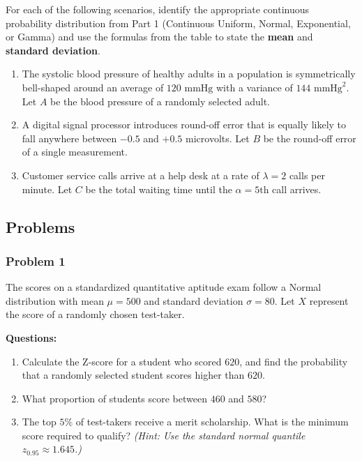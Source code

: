 \documentclass[
]{article}
\providecommand{\tightlist}{%
  \setlength{\itemsep}{0pt}\setlength{\parskip}{0pt}}
\begin{document}
For each of the following scenarios, identify the appropriate continuous
probability distribution from Part 1 (Continuous Uniform, Normal,
Exponential, or Gamma) and use the formulas from the table to state the
\textbf{mean} and \textbf{standard deviation}.

\begin{enumerate}
\def\labelenumi{\arabic{enumi}.}
\tightlist
\item
  The systolic blood pressure of healthy adults in a population is
  symmetrically bell-shaped around an average of \(120\text{ mmHg}\)
  with a variance of \(144\text{ mmHg}^2\). Let \(A\) be the blood
  pressure of a randomly selected adult.
\item
  A digital signal processor introduces round-off error that is equally
  likely to fall anywhere between \(-0.5\) and \(+0.5\) microvolts. Let
  \(B\) be the round-off error of a single measurement.
\item
  Customer service calls arrive at a help desk at a rate of
  \(\lambda = 2\) calls per minute. Let \(C\) be the total waiting time
  until the \(\alpha = 5\text{th}\) call arrives.
\end{enumerate}

\subsection{Problems}\label{problems}

\subsubsection{Problem 1}\label{problem-1}

The scores on a standardized quantitative aptitude exam follow a Normal
distribution with mean \(\mu = 500\) and standard deviation
\(\sigma = 80\). Let \(X\) represent the score of a randomly chosen
test-taker.

\textbf{Questions:}

\begin{enumerate}
\def\labelenumi{\alph{enumi})}
\tightlist
\item
  Calculate the Z-score for a student who scored \(620\), and find the
  probability that a randomly selected student scores higher than
  \(620\).
\item
  What proportion of students score between \(460\) and \(580\)?
\item
  The top \(5\%\) of test-takers receive a merit scholarship. What is
  the minimum score required to qualify? \emph{(Hint: Use the standard
  normal quantile \(z_{0.95} \approx 1.645\).)}
\end{enumerate}
\end{document}
